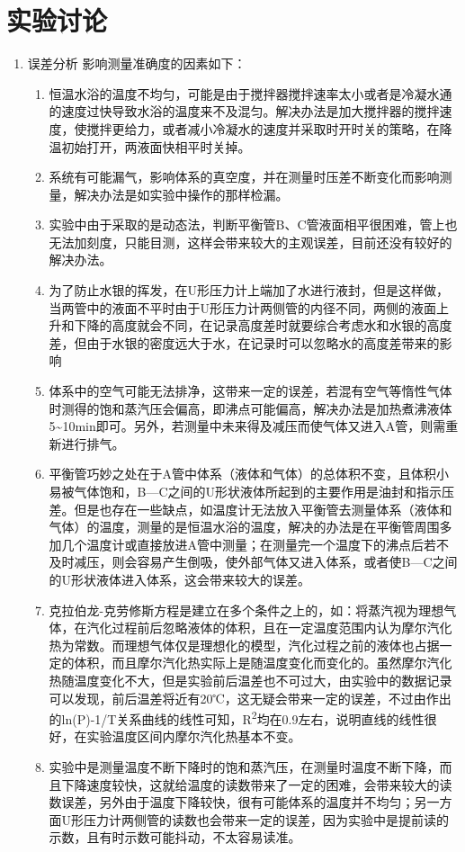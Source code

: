 \documentclass[11pt]{report}
\begin{document}
\section{实验讨论}
\label{sec:org74e747f}
\begin{enumerate}
\item 误差分析
\label{sec:org2c85bc7}
影响测量准确度的因素如下：
\begin{enumerate}
\item 恒温水浴的温度不均匀，可能是由于搅拌器搅拌速率太小或者是冷凝水通的速度过快导致水浴的温度来不及混匀。解决办法是加大搅拌器的搅拌速度，使搅拌更给力，或者减小冷凝水的速度并采取时开时关的策略，在降温初始打开，两液面快相平时关掉。
\item 系统有可能漏气，影响体系的真空度，并在测量时压差不断变化而影响测量，解决办法是如实验中操作的那样检漏。
\item 实验中由于采取的是动态法，判断平衡管B、C管液面相平很困难，管上也无法加刻度，只能目测，这样会带来较大的主观误差，目前还没有较好的解决办法。
\item 为了防止水银的挥发，在U形压力计上端加了水进行液封，但是这样做，当两管中的液面不平时由于U形压力计两侧管的内径不同，两侧的液面上升和下降的高度就会不同，在记录高度差时就要综合考虑水和水银的高度差，但由于水银的密度远大于水，在记录时可以忽略水的高度差带来的影响
\item 体系中的空气可能无法排净，这带来一定的误差，若混有空气等惰性气体时测得的饱和蒸汽压会偏高，即沸点可能偏高，解决办法是加热煮沸液体5\textasciitilde{}10min即可。另外，若测量中未来得及减压而使气体又进入A管，则需重新进行排气。
\item 平衡管巧妙之处在于A管中体系（液体和气体）的总体积不变，且体积小易被气体饱和，B—C之间的U形状液体所起到的主要作用是油封和指示压差。但是也存在一些缺点，如温度计无法放入平衡管去测量体系（液体和气体）的温度，测量的是恒温水浴的温度，解决的办法是在平衡管周围多加几个温度计或直接放进A管中测量；在测量完一个温度下的沸点后若不及时减压，则会容易产生倒吸，使外部气体又进入体系，或者使B—C之间的U形状液体进入体系，这会带来较大的误差。
\item 克拉伯龙-克劳修斯方程是建立在多个条件之上的，如：将蒸汽视为理想气体，在汽化过程前后忽略液体的体积，且在一定温度范围内认为摩尔汽化热为常数。而理想气体仅是理想化的模型，汽化过程之前的液体也占据一定的体积，而且摩尔汽化热实际上是随温度变化而变化的。虽然摩尔汽化热随温度变化不大，但是实验前后温差也不可过大，由实验中的数据记录可以发现，前后温差将近有20℃，这无疑会带来一定的误差，不过由作出的ln(P)-1/T关系曲线的线性可知，R\textsuperscript{2}均在0.9左右，说明直线的线性很好，在实验温度区间内摩尔汽化热基本不变。
\item 实验中是测量温度不断下降时的饱和蒸汽压，在测量时温度不断下降，而且下降速度较快，这就给温度的读数带来了一定的困难，会带来较大的读数误差，另外由于温度下降较快，很有可能体系的温度并不均匀；另一方面U形压力计两侧管的读数也会带来一定的误差，因为实验中是提前读的示数，且有时示数可能抖动，不太容易读准。
\end{enumerate}


\end{enumerate}
\end{document}
